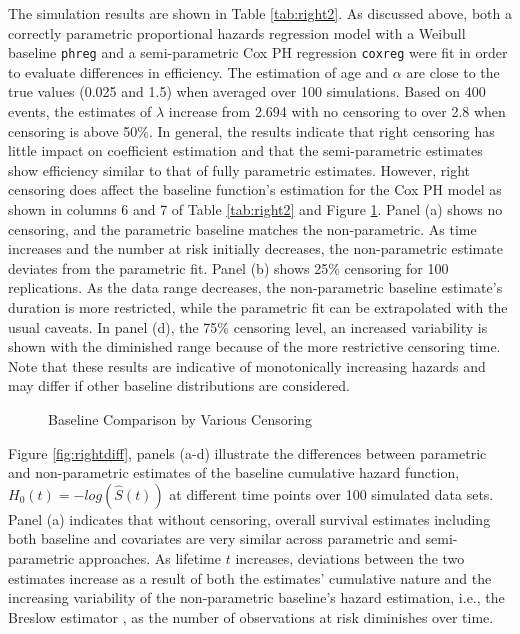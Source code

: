 The simulation results are shown in Table \ref{tab:right2}. As discussed above, both a correctly parametric proportional hazards regression model with a Weibull baseline {\tt phreg} and a semi-parametric Cox PH regression {\tt coxreg} were fit in order to evaluate differences in efficiency. The estimation of age and $\alpha$ are close to the true values (0.025 and 1.5) when averaged over 100 simulations. Based on 400 events, the estimates of $\lambda$ increase from 2.694 with no censoring to over 2.8 when censoring is above 50\%. In general, the results indicate that right censoring has little impact on coefficient estimation and that the semi-parametric estimates show efficiency similar to that of fully parametric estimates. However, right censoring does affect the baseline function's estimation for the Cox PH model as shown in columns 6 and 7 of Table \ref{tab:right2} and Figure \ref{fig:rightbase}. Panel (a) shows no censoring, and the parametric baseline matches the non-parametric. As time increases and the number at risk initially decreases, the non-parametric estimate deviates from the parametric fit. Panel (b) shows 25\% censoring for 100 replications. As the data range decreases, the non-parametric baseline estimate's duration is more restricted, while the parametric fit can be extrapolated with the usual caveats. In panel (d), the 75\% censoring level, an increased variability is shown with the diminished range because of the more restrictive censoring time. Note that these results are indicative of monotonically increasing hazards and may differ if other baseline distributions are considered.

\begin{figure}[h!]
	\centering
	\quad
	\quad
	\quad
	\caption{Baseline Comparison by Various Censoring}
	\label{fig:rightbase}
\end{figure}

Figure \ref{fig:rightdiff}, panels (a-d) illustrate the differences between parametric and non-parametric estimates of the baseline cumulative hazard function, $H_0(t)=-log(\hat{S}(t))$ at different time points over 100 simulated data sets.  Panel (a) indicates that without censoring, overall survival estimates including both baseline and covariates are very similar across parametric and semi-parametric approaches.  As lifetime $t$ increases, deviations between the two estimates increase as a result of both the estimates' cumulative nature and the increasing variability of the non-parametric baseline's hazard estimation, i.e., the Breslow estimator \citep{davison1997,Burr1994}, as the number of observations at risk diminishes over time.


